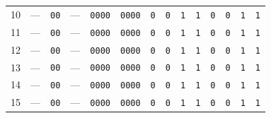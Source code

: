 \begin{tabular}{@{}c c c c c c cccc cccc@{}}
10 & --- & \texttt{00} & --- & \texttt{0000} & \texttt{0000} & \texttt{0} & \texttt{0} & \texttt{1} & \texttt{1} & \texttt{0} & \texttt{0} & \texttt{1} & \texttt{1} \\
11 & --- & \texttt{00} & --- & \texttt{0000} & \texttt{0000} & \texttt{0} & \texttt{0} & \texttt{1} & \texttt{1} & \texttt{0} & \texttt{0} & \texttt{1} & \texttt{1} \\
12 & --- & \texttt{00} & --- & \texttt{0000} & \texttt{0000} & \texttt{0} & \texttt{0} & \texttt{1} & \texttt{1} & \texttt{0} & \texttt{0} & \texttt{1} & \texttt{1} \\
13 & --- & \texttt{00} & --- & \texttt{0000} & \texttt{0000} & \texttt{0} & \texttt{0} & \texttt{1} & \texttt{1} & \texttt{0} & \texttt{0} & \texttt{1} & \texttt{1} \\
14 & --- & \texttt{00} & --- & \texttt{0000} & \texttt{0000} & \texttt{0} & \texttt{0} & \texttt{1} & \texttt{1} & \texttt{0} & \texttt{0} & \texttt{1} & \texttt{1} \\
15 & --- & \texttt{00} & --- & \texttt{0000} & \texttt{0000} & \texttt{0} & \texttt{0} & \texttt{1} & \texttt{1} & \texttt{0} & \texttt{0} & \texttt{1} & \texttt{1} \\
\bottomrule
\end{tabular}